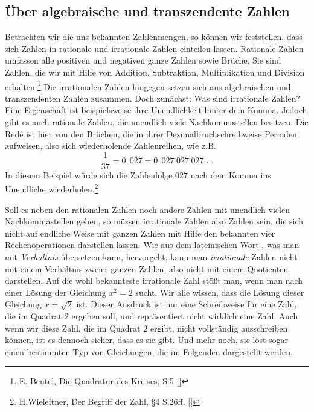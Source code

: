 \documentclass[11pt]{article}
\begin{document}
\subsection{Über algebraische und transzendente Zahlen}
Betrachten wir die uns bekannten Zahlenmengen, so können wir feststellen, dass sich Zahlen in rationale und irrationale Zahlen einteilen lassen. Rationale Zahlen umfassen alle positiven und negativen ganze Zahlen sowie Brüche. Sie sind Zahlen, die wir mit Hilfe von Addition, Subtraktion, Multiplikation und Division erhalten.\footnote{E. Beutel, Die Quadratur des Kreises, S.5 [\EugenBeutelInt]} Die irrationalen Zahlen hingegen setzen sich aus algebraischen und transzendenten Zahlen zusammen. Doch zunächst: Was sind irrationale Zahlen? Eine Eigenschaft ist beispielsweise ihre Unendlichkeit hinter dem Komma. Jedoch gibt es auch rationale Zahlen, die unendlich viele Nachkommastellen besitzen. Die Rede ist hier von den Brüchen, die in ihrer Dezimalbruchschreibweise Perioden aufweisen, also sich wiederholende Zahlenreihen, wie z.B. \[\mathrm{\frac{1}{37}=0,\overline{027}=0,027^\cdot027^\cdot027....}\]In diesem Beispiel würde sich die Zahlenfolge \(027\) nach dem Komma ins Unendliche wiederholen.\footnote{\label{note1}H.Wieleitner, Der Begriff der Zahl, §4 S.26ff. [\WieleitnerInt]} \par Soll es neben den rationalen Zahlen noch andere Zahlen mit unendlich vielen Nachkommastellen geben, so müssen irrationale Zahlen also Zahlen sein, die sich nicht auf endliche Weise mit ganzen Zahlen mit Hilfe den bekannten vier Rechenoperationen darstellen lassen. Wie aus dem lateinischen Wort \ratio, was man mit \glqq \textsl{Verhältnis}\grqq{} übersetzen kann, hervorgeht, kann man \glqq \textsl{irrationale}\grqq{} Zahlen nicht mit einem Verhältnis zweier ganzen Zahlen, also nicht mit einem Quotienten darstellen. Auf die wohl bekannteste irrationale Zahl stößt man, wenn man nach einer Lösung der Gleichung \(x^2=2\) sucht. Wir alle wissen, dass die Lösung dieser Gleichung $x=\sqrt{2}$ ist. Dieser Ausdruck ist nur eine Schreibweise für eine Zahl, die im Quadrat $2$ ergeben soll, und repräsentiert nicht wirklich eine Zahl. Auch wenn wir diese Zahl, die im Quadrat $2$ ergibt, nicht vollständig ausschreiben können, ist es dennoch sicher, dass es sie gibt. Und mehr noch, sie löst sogar einen bestimmten Typ von Gleichungen, die im Folgenden dargestellt werden. \\
\end{document}
